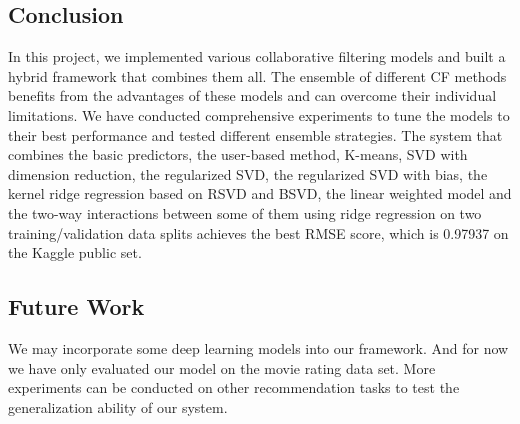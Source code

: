 \documentclass[10pt,conference,compsocconf]{IEEEtran}
\begin{document}
\subsection{Conclusion}
In this project, we implemented various collaborative filtering models and built a hybrid framework that combines them all. The ensemble of different CF methods benefits from the advantages of these models and can overcome their individual limitations. We have conducted comprehensive experiments to tune the models to their best performance and tested different ensemble strategies. The system that combines the basic predictors, the user-based method, K-means, SVD with dimension reduction, the regularized SVD, the regularized SVD with bias, the kernel ridge regression based on RSVD and BSVD, the linear weighted model and the two-way interactions between some of them using ridge regression on two training/validation data splits achieves the best RMSE score, which is 0.97937 on the Kaggle public set.

\subsection{Future Work}
We may incorporate some deep learning models into our framework. And for now we have only evaluated our model on the movie rating data set. More experiments can be conducted on other recommendation tasks to test the generalization ability of our system.



\end{document}
